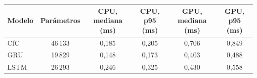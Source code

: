 \begin{tabular}{|l|c|c|c|c|c|}
\hline
\textbf{Modelo} & \textbf{Parámetros} & \textbf{CPU, mediana (ms)} & \textbf{CPU, p95 (ms)} & \textbf{GPU, mediana (ms)} & \textbf{GPU, p95 (ms)} \\ \hline
CfC & 46\,133 & 0{,}185 & 0{,}205 & 0{,}706 & 0{,}849 \\ \hline
GRU & 19\,829 & 0{,}148 & 0{,}173 & 0{,}403 & 0{,}488 \\ \hline
LSTM & 26\,293 & 0{,}246 & 0{,}325 & 0{,}430 & 0{,}558 \\ \hline
\end{tabular}
